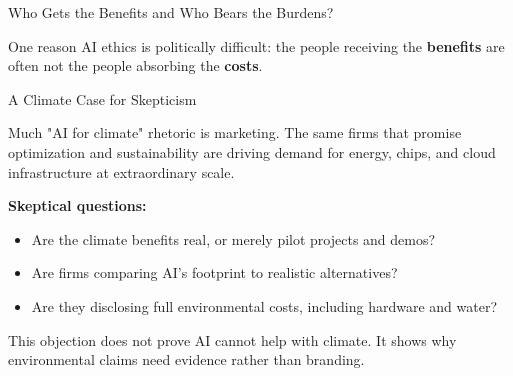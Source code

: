 \documentclass[aspectratio=169,11pt]{beamer}
\begin{document}
\begin{frame}{Who Gets the Benefits and Who Bears the Burdens?}
\begin{center}
\end{center}

\vspace{0.2cm}
One reason AI ethics is politically difficult: the people receiving the \textbf{benefits} are often not the people absorbing the \textbf{costs}.
\end{frame}

\begin{frame}{A Climate Case for Skepticism}
\begin{objectionbox}
Much "AI for climate" rhetoric is marketing. The same firms that promise optimization and sustainability are driving demand for energy, chips, and cloud infrastructure at extraordinary scale.
\end{objectionbox}

\vspace{0.2cm}
\textbf{Skeptical questions:}
\begin{itemize}
    \item Are the climate benefits real, or merely pilot projects and demos?
    \item Are firms comparing AI's footprint to realistic alternatives?
    \item Are they disclosing full environmental costs, including hardware and water?
\end{itemize}

\vspace{0.2cm}
This objection does not prove AI cannot help with climate. It shows why environmental claims need evidence rather than branding.
\end{frame}
\end{document}
